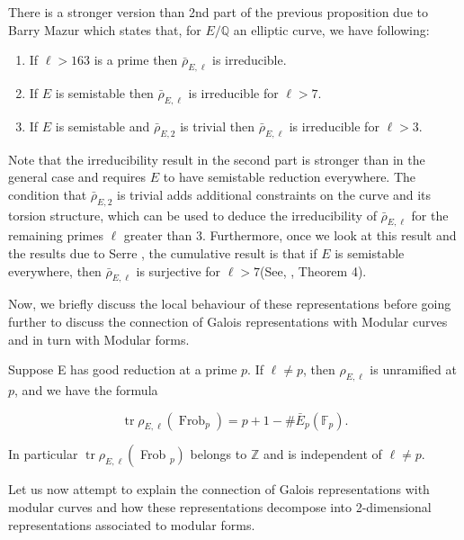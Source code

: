 \begin{remark}
    There is a stronger version than 2nd part of the previous proposition due to Barry Mazur which states that, for $E / \mathbb{Q}$ an elliptic curve, we have following: 
    \begin{enumerate}
        \item If $\ell>163$ is a prime then $\bar{\rho}_{E, \ell}$ is irreducible.

        \item If $E$ is semistable then $\bar{\rho}_{E, \ell}$ is irreducible for $\ell>7$.
        \item If $E$ is semistable and $\bar{\rho}_{E, 2}$ is trivial then $\bar{\rho}_{E, \ell}$ is irreducible for $\ell>3$.\end{enumerate} 
        
Note that the irreducibility result in the second part is stronger than in the general case and requires $E$ to have semistable reduction everywhere. The condition that \( \bar{\rho}_{E, 2} \) is trivial adds additional constraints on the curve and its torsion structure, which can be used to deduce the irreducibility of \( \bar{\rho}_{E, \ell} \) for the remaining primes \( \ell \) greater than 3. Furthermore, once we look at this result and the results due to Serre \cite{serre1968abelian}, the cumulative result is that if $E$ is semistable everywhere, then $\bar{\rho}_{E, \ell}$ is surjective for $\ell>7$(See, \cite{mazur1978rational}, Theorem 4).

\end{remark}


Now, we briefly discuss the local behaviour of these representations before going further to discuss the connection of Galois representations with Modular curves and in turn with Modular forms. 

\begin{theorem}
    Suppose E has good reduction at a prime $p$. If $\ell \neq p$, then $\rho_{E, \ell}$ is unramified at $p$, and we have the formula

$$
\operatorname{tr} \rho_{E, \ell}\left(\operatorname{Frob}_{p}\right)=p+1-\# \bar{E}_{p}\left(\mathbb{F}_{p}\right) .
$$

In particular $\operatorname{tr} \rho_{E, \ell}\left(\right.$ Frob $\left._{p}\right)$ belongs to $\mathbb{Z}$ and is independent of $\ell \neq p$.

\end{theorem}

Let us now attempt to explain the connection of Galois representations with modular curves and how these representations decompose into 2-dimensional representations associated to modular forms.


